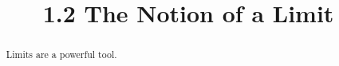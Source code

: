 \documentclass{ximera}
\title{1.2 The Notion of a Limit}
\begin{document}
\begin{abstract}
Limits are a powerful tool.
\end{abstract}







\end{document}
